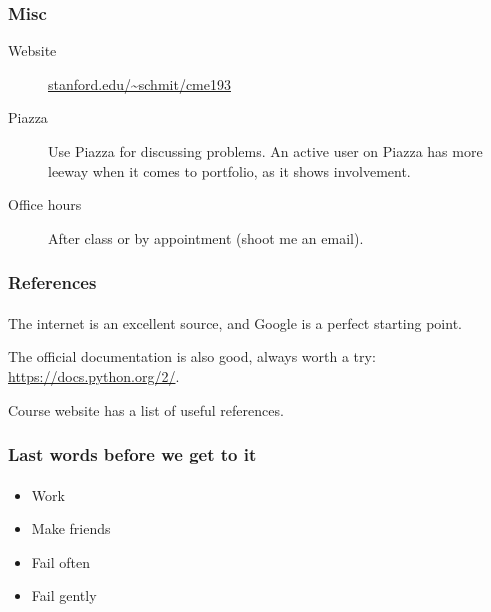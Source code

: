 \begin{frame}\frametitle{Misc}

\begin{description}
    \item[Website] \url{stanford.edu/\~schmit/cme193}
    \item[Piazza] Use Piazza for discussing problems. An active user on Piazza has more leeway when it comes to portfolio, as it shows involvement.
    \item[Office hours] After class or by appointment (shoot me an email).
\end{description}

\end{frame}

\begin{frame}\frametitle{References}
    \framesubtitle{}

    The internet is an excellent source, and Google is a perfect starting point.

    \vfill

    The official documentation is also good, always worth a try:
    \url{https://docs.python.org/2/}.

    \vfill

    Course website has a list of useful references.

\end{frame}

\begin{frame}\frametitle{Last words before we get to it}
    \framesubtitle{}

    \begin{itemize}
        \item Work
        \item Make friends
        \item Fail often
        \item Fail gently
    \end{itemize}

\end{frame}


